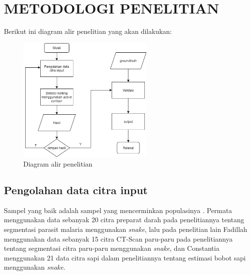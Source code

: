 
\chapter{METODOLOGI PENELITIAN}
Berikut ini diagram alir penelitian yang akan dilakukan:
\begin{figure}[H]
	\centering
	\includegraphics[width=0.6\textwidth]{diagram/metodepenelitian_alur}
	\caption{Diagram alir penelitian}
	\label{Gambar:metodepenelitian_alur}
\end{figure}

\section{Pengolahan data citra input}
Sampel yang baik adalah sampel yang mencerminkan populasinya \citep{amirullah2015metode}. Permata menggunakan data sebanyak 20 citra preparat darah pada penelitiannya tentang segmentasi parasit malaria menggunakan \emph{snake}\citep{permata2015penggunaan}, lalu pada penelitian lain Fadillah menggunakan data sebanyak 15 citra CT-Scan paru-paru pada penelitiannya tentang segmentasi citra paru-paru menggunakan \emph{snake}, dan Constantia menggunakan 21 data citra sapi dalam penelitiannya tentang estimasi bobot sapi menggunakan \emph{snake}\citep{constantia2019estimasi}. 


